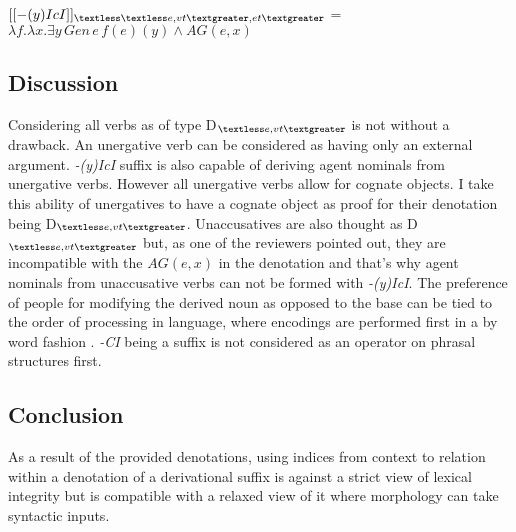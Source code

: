 \begin{exe}
    \ex \label{denotation2}
      $[[-(y)IcI]]_{\textless \textless e,vt\textgreater, et \textgreater}$ = $\lambda{f}.\lambda{x}.\exists{y}\,Gen\,e\,f(e)(y) \wedge AG(e,x)$
\end{exe}


    \subsection{Discussion}

Considering all verbs as of type D$_{\textless e,vt\textgreater}$ is not without a drawback. An unergative verb can be considered as having only an external argument. \textit{-(y)IcI} suffix is also capable of deriving agent nominals from unergative verbs. However all unergative verbs allow for cognate objects. I take this ability of unergatives to have a cognate object as proof for their denotation being D$_{\textless e,vt\textgreater}$. Unaccusatives are also thought as D$_{\textless e,vt\textgreater}$ but, as one of the reviewers pointed out, they are incompatible with the $AG(e,x)$ in the denotation and that's why agent nominals from unaccusative verbs can not be formed with \textit{-(y)IcI}. The preference of people for modifying the derived noun as opposed to the base can be tied to the order of processing in language, where encodings are performed first in a by word fashion \citep{lewis2006computational}. \textit{-CI} being a suffix is not considered as an operator on phrasal structures first.

\subsection{Conclusion}

As a result of the provided denotations, using indices from context to relation within a denotation of a derivational suffix is against a strict view of lexical integrity \cite{bresnan1995lexical} but is compatible with a relaxed view of it \citep{lieber2006lexical,goksel2015phrasal,kunduraci2016morphology} where morphology can take syntactic inputs.
